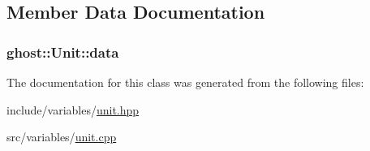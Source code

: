 \subsection{Member Data Documentation}
\hypertarget{classghost_1_1Unit_a7ca43892e28cb7df114d17cb297d6617}{
\subsubsection[{data}]{ ghost\-::\-Unit\-::data\hspace{0.3cm}{\ttfamily [private]}}}\label{classghost_1_1Unit_a7ca43892e28cb7df114d17cb297d6617}


The documentation for this class was generated from the following files\-:\begin{DoxyCompactItemize}
\item 
include/variables/\hyperlink{unit_8hpp}{unit.\-hpp}\item 
src/variables/\hyperlink{unit_8cpp}{unit.\-cpp}\end{DoxyCompactItemize}
